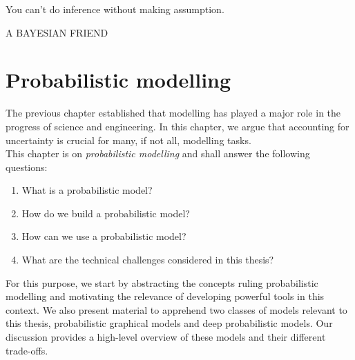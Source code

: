 {\centering
\parbox{\textwidth}{%
  \raggedright{\itshape%

  You can't do inference without making assumption.\par\bigskip
  }
  \raggedleft\MakeUppercase{A Bayesian friend}\par%
}}

\chapter{Probabilistic modelling}\label{ch:02}

\begin{chapter_outline}

  The previous chapter established that modelling has played a major role in the progress of science and engineering.
  In this chapter, we argue that accounting for uncertainty is crucial for many, if not all, modelling tasks.
  \\
  This chapter is on \textit{probabilistic modelling} and shall answer the following questions:
  \begin{enumerate}
    \item What is a probabilistic model?
    \item How do we build a probabilistic model?
    \item How can we use a probabilistic model?
    \item What are the technical challenges considered in this thesis?
  \end{enumerate}
    For this purpose, we start by abstracting the concepts ruling probabilistic modelling and motivating the relevance of developing powerful tools in this context. We also present material to apprehend two classes of models relevant to this thesis, probabilistic graphical models and deep probabilistic models. Our discussion provides a high-level overview of these models and their different trade-offs.
\end{chapter_outline}


